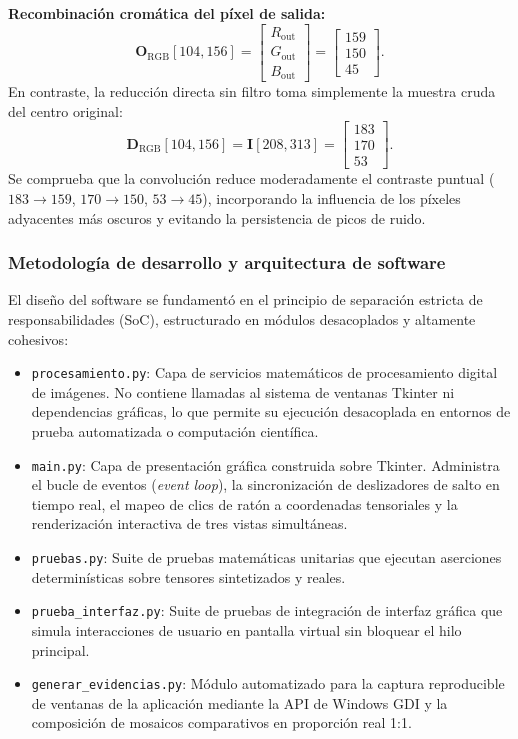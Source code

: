 \documentclass[11pt]{article}
\begin{document}
\textbf{Recombinación cromática del píxel de salida:}
\begin{equation}
\mathbf{O}_{\text{RGB}}[104, 156] = \begin{bmatrix} R_{\text{out}} \\ G_{\text{out}} \\ B_{\text{out}} \end{bmatrix} = \begin{bmatrix} 159 \\ 150 \\ 45 \end{bmatrix}.
\end{equation}
En contraste, la reducción directa sin filtro toma simplemente la muestra cruda del centro original:
\begin{equation}
\mathbf{D}_{\text{RGB}}[104, 156] = \mathbf{I}[208, 313] = \begin{bmatrix} 183 \\ 170 \\ 53 \end{bmatrix}.
\end{equation}
Se comprueba que la convolución reduce moderadamente el contraste puntual ($183 \to 159$, $170 \to 150$, $53 \to 45$), incorporando la influencia de los píxeles adyacentes más oscuros y evitando la persistencia de picos de ruido.

\subsubsection{Metodología de desarrollo y arquitectura de software}

El diseño del software se fundamentó en el principio de separación estricta de responsabilidades (SoC), estructurado en módulos desacoplados y altamente cohesivos:
\begin{itemize}[itemsep=0.3em]
\item \texttt{procesamiento.py}: Capa de servicios matemáticos de procesamiento digital de imágenes. No contiene llamadas al sistema de ventanas Tkinter ni dependencias gráficas, lo que permite su ejecución desacoplada en entornos de prueba automatizada o computación científica.
\item \texttt{main.py}: Capa de presentación gráfica construida sobre Tkinter. Administra el bucle de eventos (\textit{event loop}), la sincronización de deslizadores de salto en tiempo real, el mapeo de clics de ratón a coordenadas tensoriales y la renderización interactiva de tres vistas simultáneas.
\item \texttt{pruebas.py}: Suite de pruebas matemáticas unitarias que ejecutan aserciones determinísticas sobre tensores sintetizados y reales.
\item \texttt{prueba\_interfaz.py}: Suite de pruebas de integración de interfaz gráfica que simula interacciones de usuario en pantalla virtual sin bloquear el hilo principal.
\item \texttt{generar\_evidencias.py}: Módulo automatizado para la captura reproducible de ventanas de la aplicación mediante la API de Windows GDI y la composición de mosaicos comparativos en proporción real 1:1.
\end{itemize}
\end{document}
